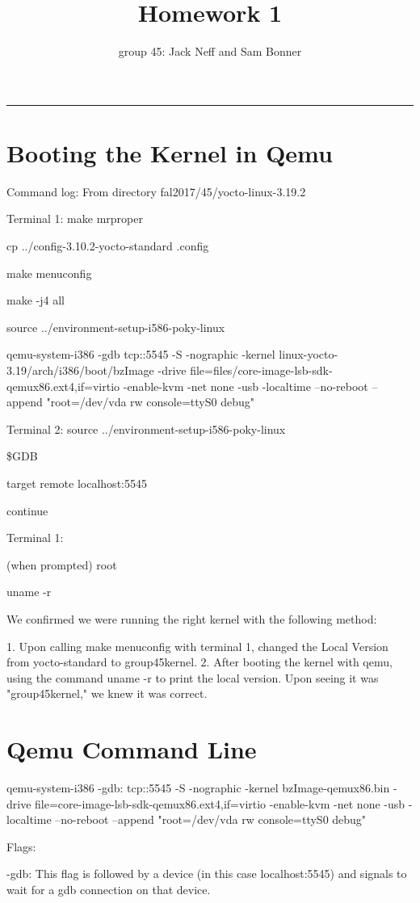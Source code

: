 \documentclass[letterpaper,10pt,fleqn]{article}
\title{Homework 1}
\author{group 45: Jack Neff and Sam Bonner}
\begin{document}
\maketitle
\hrule

\section*{Booting the Kernel in Qemu}

Command log:
From directory fal2017/45/yocto-linux-3.19.2

Terminal 1: 
make mrproper

cp ../config-3.10.2-yocto-standard .config

make menuconfig

make -j4 all

source ../environment-setup-i586-poky-linux

qemu-system-i386 -gdb tcp::5545 -S -nographic -kernel linux-yocto-3.19/arch/i386/boot/bzImage -drive file=files/core-image-lsb-sdk-qemux86.ext4,if=virtio -enable-kvm -net none -usb -localtime --no-reboot --append "root=/dev/vda rw console=ttyS0 debug"

Terminal 2: 
source ../environment-setup-i586-poky-linux

\$GDB

target remote localhost:5545

continue

Terminal 1: 

(when prompted) root

uname -r

We confirmed we were running the right kernel with the following method:

1. Upon calling make menuconfig with terminal 1, changed the Local Version from yocto-standard to group45kernel. 
2. After booting the kernel with qemu, using the command uname -r to print the local version. Upon seeing it was "group45kernel," we knew it was correct. 

\section{Qemu Command Line}
qemu-system-i386 -gdb: tcp::5545 -S -nographic -kernel bzImage-qemux86.bin -drive file=core-image-lsb-sdk-qemux86.ext4,if=virtio -enable-kvm -net none -usb -localtime --no-reboot --append "root=/dev/vda rw console=ttyS0 debug"


Flags: 

-gdb: This flag is followed by a device (in this case localhost:5545) and signals to wait for a gdb connection on that device. 
\end{document}
